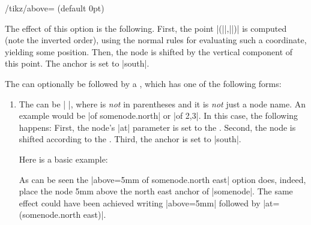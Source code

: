 \begin{key}{/tikz/above= (default 0pt)}
\begin{enumerate}
            The effect of this option is the following. First, the point
            |(||,||)|
            is computed (note the inverted order), using the normal rules for
            evaluating such a coordinate, yielding some position. Then, the
            node is shifted by the vertical component of this point. The anchor
            is set to |south|.
\begin{codeexample}[preamble={\usetikzlibrary{positioning}}]
\end{codeexample}
    \end{enumerate}
    The  can optionally be followed by a ,
    which has one of the following forms:
    \begin{enumerate}
        \item The  can be
            | |, where  is
            \emph{not} in parentheses and it is \emph{not} just a node name. An
            example would be |of somenode.north| or |of {2,3}|. In this case, the
            following happens: First, the node's |at| parameter is set to the
            . Second, the node is shifted according to the
            . Third, the anchor is set to |south|.

            Here is a basic example:
\begin{codeexample}[preamble={\usetikzlibrary{positioning}}]
\end{codeexample}
            As can be seen the |above=5mm of somenode.north east| option does,
            indeed, place the node 5mm above the north east anchor of
            |somenode|. The same effect could have been achieved writing
            |above=5mm| followed by |at=(somenode.north east)|.


\end{enumerate}
\end{key}
